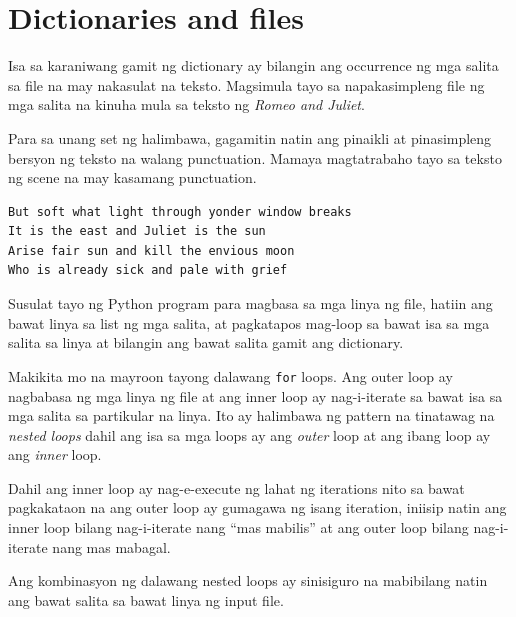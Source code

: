 \documentclass[10pt,]{book}
\begin{document}

\section{Dictionaries and files}\label{dictionaries-and-files}

Isa sa karaniwang gamit ng dictionary ay bilangin ang occurrence ng mga
salita sa file na may nakasulat na teksto. Magsimula tayo sa
napakasimpleng file ng mga salita na kinuha mula sa teksto ng
\emph{Romeo and Juliet}.

Para sa unang set ng halimbawa, gagamitin natin ang pinaikli at
pinasimpleng bersyon ng teksto na walang punctuation. Mamaya
magtatrabaho tayo sa teksto ng scene na may kasamang punctuation.

{\small
\begin{verbatim}
But soft what light through yonder window breaks
It is the east and Juliet is the sun
Arise fair sun and kill the envious moon
Who is already sick and pale with grief
\end{verbatim}
}

Susulat tayo ng Python program para magbasa sa mga linya ng file, hatiin
ang bawat linya sa list ng mga salita, at pagkatapos mag-loop sa bawat
isa sa mga salita sa linya at bilangin ang bawat salita gamit ang
dictionary.

 

Makikita mo na mayroon tayong dalawang \texttt{for} loops. Ang outer
loop ay nagbabasa ng mga linya ng file at ang inner loop ay
nag-i-iterate sa bawat isa sa mga salita sa partikular na linya. Ito ay
halimbawa ng pattern na tinatawag na \emph{nested loops} dahil ang isa
sa mga loops ay ang \emph{outer} loop at ang ibang loop ay ang
\emph{inner} loop.

Dahil ang inner loop ay nag-e-execute ng lahat ng iterations nito sa
bawat pagkakataon na ang outer loop ay gumagawa ng isang iteration,
iniisip natin ang inner loop bilang nag-i-iterate nang ``mas mabilis''
at ang outer loop bilang nag-i-iterate nang mas mabagal.


Ang kombinasyon ng dalawang nested loops ay sinisiguro na mabibilang
natin ang bawat salita sa bawat linya ng input file.
\end{document}
